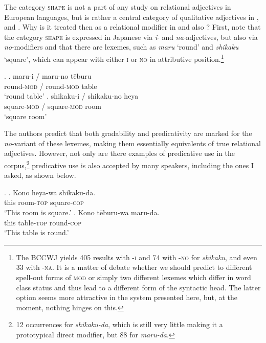 The category \textsc{shape} is not a part of any study on relational adjectives in European languages, but is rather a central category of qualitative adjectives in \citet{sproat:1991:the, cinque:1993:evidence, cinque:2010:adj}, \citet{scott:2002:stacked} and \citet{laenzlinger:2005:french, laenzlinger:2011:elements}. Why is it treated then as a relational modifier in \citet{nagano:2016:are} and also \citet{morita:2010:internal, morita:2011:three}? First, note that the category \textsc{shape} is expressed in Japanese via \textit{i}- and \textit{na}-adjectives, but also via \textit{no}-modifiers and that there are lexemes, such as \textit{maru} `round' and \textit{shikaku} `square’, which can appear with either \textsc{i} or \textsc{no} in attributive position.\footnote{The BCCWJ yields 405 results with -\textsc{i} and 74 with -\textsc{no} for \textit{shikaku}, and even 33 with -\textsc{na}. It is a matter of debate whether we should predict to different spell-out forms of \textsc{mod} or simply two different lexemes which differ in word class status and thus lead to a different form of the syntactic head. The latter option seems more attractive in the system presented here, but, at the moment, nothing hinges on this.}

\ex. \ag. maru-i / maru-no tēburu\\
round-\textsc{mod} / round-\textsc{mod} table\\
`round table'
\bg. shikaku-i / shikaku-no heya\\
square-\textsc{mod} / square-\textsc{mod} room\\
`square room'

The authors predict that both gradability and predicativity are marked for the \textit{no}-variant of these lexemes, making them essentially equivalents of true relational adjectives. However, not only are there examples of predicative use in the corpus,\footnote{12 occurrences for \textit{shikaku-da}, which is still very little making it a prototypical direct modifier, but 88 for \textit{maru-da}.} predicative use is also accepted by many speakers, including the ones I asked, as shown below.

\ex. \ag. Kono heya-wa shikaku-da.\\
this room-\textsc{top} square-\textsc{cop}\\
`This room is square.’
\bg. Kono tēburu-wa maru-da.\\
this table-\textsc{top} round-\textsc{cop}\\
`This table is round.’


